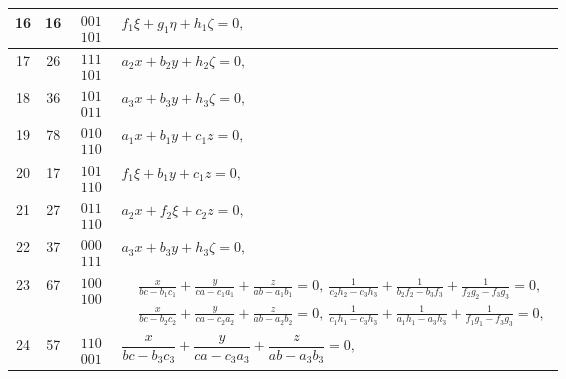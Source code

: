 \documentclass[11pt,a4paper]{article}
\begin{document}
\begin{center}
\begin{tabular}{|c|c|c|l|}
16 & 16 & $\begin{array}{c}001\\101\end{array}$ & $f_{1}\xi + g_{1}\eta + h_{1}\zeta = 0,$ \\\hline
17 & 26 & $\begin{array}{c}111\\101\end{array}$ & $a_{2}x + b_{2}y + h_{2}\zeta = 0,$ \\\hline
18 & 36 & $\begin{array}{c}101\\011\end{array}$ & $a_{3}x + b_{3}y + h_{3}\zeta = 0,$ \\\hline
19 & 78 & $\begin{array}{c}010\\110\end{array}$ & $a_{1}x + b_{1}y + c_{1}z = 0,$ \\\hline
20 & 17 & $\begin{array}{c}101\\110\end{array}$ & $f_{1}\xi + b_{1}y + c_{1}z = 0,$ \\\hline
21 & 27 & $\begin{array}{c}011\\110\end{array}$ & $a_{2}x + f_{2}\xi + c_{2}z = 0,$ \\\hline
22 & 37 & $\begin{array}{c}000\\111\end{array}$ & $a_{3}x + b_{3}y + h_{3}\zeta = 0,$ \\\hline
23 & 67 & $\begin{array}{c}100\\100\end{array}$ & $\begin{aligned}&\tfrac{x}{bc - b_{1}c_{1}} + \tfrac{y}{ca - c_{1}a_{1}} + \tfrac{z}{ab - a_{1}b_{1}} = 0,\ \tfrac{1}{c_{2}h_{2} - c_{3}h_{3}} + \tfrac{1}{b_{2}f_{2} - b_{3}f_{3}} + \tfrac{1}{f_{2}g_{2} - f_{3}g_{3}} = 0,\\&\tfrac{x}{bc - b_{2}c_{2}} + \tfrac{y}{ca - c_{2}a_{2}} + \tfrac{z}{ab - a_{2}b_{2}} = 0,\ \tfrac{1}{c_{1}h_{1} - c_{3}h_{3}} + \tfrac{1}{a_{1}h_{1} - a_{3}h_{3}} + \tfrac{1}{f_{1}g_{1} - f_{3}g_{3}} = 0,\end{aligned}$ \\\hline
24 & 57 & $\begin{array}{c}110\\001\end{array}$ & $\dfrac{x}{bc - b_{3}c_{3}} + \dfrac{y}{ca - c_{3}a_{3}} + \dfrac{z}{ab - a_{3}b_{3}} = 0,$ \\\hline

\end{tabular}
\end{center}
\end{document}
